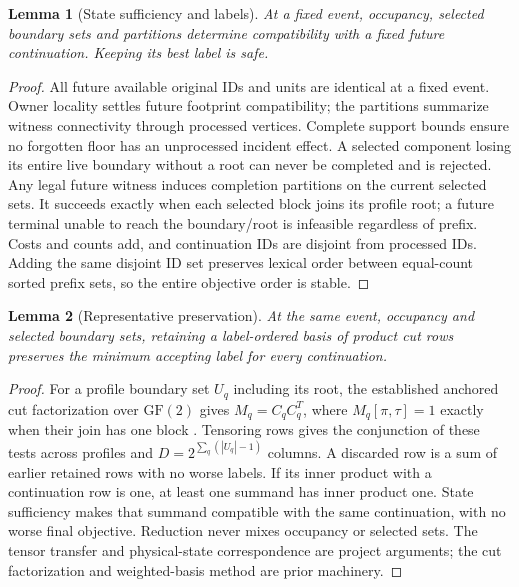 \documentclass[10pt]{article}
\newtheorem{lemma}{Lemma}
\begin{document}
\begin{lemma}[State sufficiency and labels]
At a fixed event, occupancy, selected boundary sets and partitions determine compatibility with a fixed future continuation. Keeping its best label is safe.
\end{lemma}
\begin{proof}
All future available original IDs and units are identical at a fixed event. Owner locality settles future footprint compatibility; the partitions summarize witness connectivity through processed vertices. Complete support bounds ensure no forgotten floor has an unprocessed incident effect. A selected component losing its entire live boundary without a root can never be completed and is rejected. Any legal future witness induces completion partitions on the current selected sets. It succeeds exactly when each selected block joins its profile root; a future terminal unable to reach the boundary/root is infeasible regardless of prefix. Costs and counts add, and continuation IDs are disjoint from processed IDs. Adding the same disjoint ID set preserves lexical order between equal-count sorted prefix sets, so the entire objective order is stable.
\end{proof}

\begin{lemma}[Representative preservation]
At the same event, occupancy and selected boundary sets, retaining a label-ordered basis of product cut rows preserves the minimum accepting label for every continuation.
\end{lemma}
\begin{proof}
For a profile boundary set $U_q$ including its root, the established anchored cut factorization over $\mathrm{GF}(2)$ gives $M_q=C_qC_q^T$, where $M_q[\pi,\tau]=1$ exactly when their join has one block \cite{rank}. Tensoring rows gives the conjunction of these tests across profiles and $D=2^{\sum_q(|U_q|-1)}$ columns. A discarded row is a sum of earlier retained rows with no worse labels. If its inner product with a continuation row is one, at least one summand has inner product one. State sufficiency makes that summand compatible with the same continuation, with no worse final objective. Reduction never mixes occupancy or selected sets. The tensor transfer and physical-state correspondence are project arguments; the cut factorization and weighted-basis method are prior machinery.
\end{proof}
\end{document}

